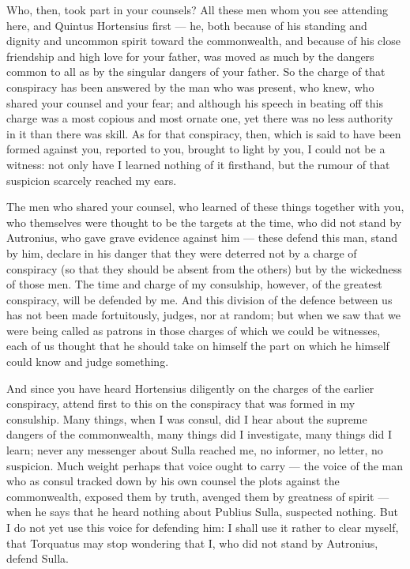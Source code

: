  Who, then, took part in your counsels? All these men whom you see attending here, and Quintus Hortensius first --- he, both because of his standing and dignity and uncommon spirit toward the commonwealth, and because of his close friendship and high love for your father, was moved as much by the dangers common to all as by the singular dangers of your father. So the charge of that conspiracy has been answered by the man who was present, who knew, who shared your counsel and your fear; and although his speech in beating off this charge was a most copious and most ornate one, yet there was no less authority in it than there was skill. As for that conspiracy, then, which is said to have been formed against you, reported to you, brought to light by you, I could not be a witness: not only have I learned nothing of it firsthand, but the rumour of that suspicion scarcely reached my ears.

 The men who shared your counsel, who learned of these things together with you, who themselves were thought to be the targets at the time, who did not stand by Autronius, who gave grave evidence against him --- these defend this man, stand by him, declare in his danger that they were deterred not by a charge of conspiracy (so that they should be absent from the others) but by the wickedness of those men. The time and charge of my consulship, however, of the greatest conspiracy, will be defended by me. And this division of the defence between us has not been made fortuitously, judges, nor at random; but when we saw that we were being called as patrons in those charges of which we could be witnesses, each of us thought that he should take on himself the part on which he himself could know and judge something.

 And since you have heard Hortensius diligently on the charges of the earlier conspiracy, attend first to this on the conspiracy that was formed in my consulship. Many things, when I was consul, did I hear about the supreme dangers of the commonwealth, many things did I investigate, many things did I learn; never any messenger about Sulla reached me, no informer, no letter, no suspicion. Much weight perhaps that voice ought to carry --- the voice of the man who as consul tracked down by his own counsel the plots against the commonwealth, exposed them by truth, avenged them by greatness of spirit --- when he says that he heard nothing about Publius Sulla, suspected nothing. But I do not yet use this voice for defending him: I shall use it rather to clear myself, that Torquatus may stop wondering that I, who did not stand by Autronius, defend Sulla.

